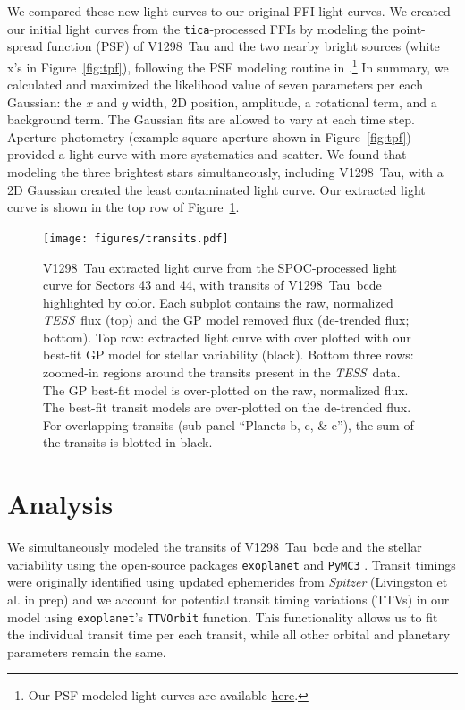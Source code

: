 \documentclass[twocolumn]{aastex631}
\newcommand{\tess}{\textit{TESS}}
\newcommand{\sname}{V1298~Tau\xspace}
\newcommand{\allplanets}{V1298~Tau~bcde\xspace}
\newcommand{\exoplanet}{\texttt{exoplanet}\xspace}
\begin{document}
We compared these new light curves to our original FFI light curves. We created our initial light curves from the \texttt{tica}-processed FFIs by modeling the point-spread function (PSF) of \sname and the two nearby bright sources (white x's in Figure~\ref{fig:tpf}), following the PSF modeling routine in \cite{feinstein19}.\footnote{Our PSF-modeled light curves are available \href{https://github.com/afeinstein20/v1298tau_tess/tree/main/lightcurves}{here}.} In summary, we calculated and maximized the likelihood value of seven parameters per each Gaussian: the $x$ and $y$ width, 2D position, amplitude, a rotational term, and a background term. The Gaussian fits are allowed to vary at each time step. Aperture photometry (example square aperture shown in Figure~\ref{fig:tpf}) provided a light curve with more systematics and scatter. We found that modeling the three brightest stars simultaneously, including \sname, with a 2D Gaussian created the least contaminated light curve. Our extracted light curve is shown in the top row of Figure~\ref{fig:transits}.

\begin{figure}[hbtp]
\begin{center}
\texttt{[image: figures/transits.pdf]}
\caption{\sname extracted light curve from the SPOC-processed light curve for Sectors 43 and 44, with transits of \allplanets highlighted by color. Each subplot contains the raw, normalized \tess\ flux (top) and the GP model removed flux (de-trended flux; bottom). Top row: extracted light curve with over plotted with our best-fit GP model for stellar variability (black). Bottom three rows: zoomed-in regions around the transits present in the \tess\ data. The GP best-fit model is over-plotted on the raw, normalized flux. The best-fit transit models are over-plotted on the de-trended flux. For overlapping transits (sub-panel ``Planets b, c, \& e''), the sum of the transits is blotted in black.} \label{fig:transits}
\end{center}
\end{figure}

\section{Analysis} \label{sec:analysis}

We simultaneously modeled the transits of \allplanets and the stellar variability using the open-source packages \exoplanet \citep{exoplanet2019, exoplanet2021} and \texttt{PyMC3} \citep{Salvatier16}. Transit timings were originally identified using updated ephemerides from \textit{Spitzer} (Livingston et al. in prep) and we account for potential transit timing variations (TTVs) in our model using \texttt{exoplanet}'s \texttt{TTVOrbit} function. This functionality allows us to fit the individual transit time per each transit, while all other orbital and planetary parameters remain the same.
\end{document}
